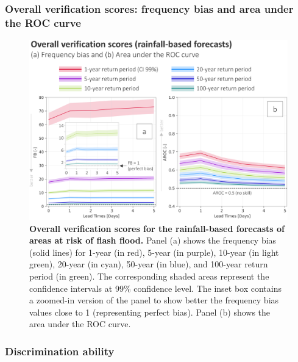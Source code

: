\subsubsection{Overall verification scores: frequency bias and area under the ROC curve}

\begin{figure}[htbp]
\centering
\includegraphics[width=\textwidth]{chapter_05/figures/rainfall_based_ff_verif_overall_scores.png}
\caption{\textbf{Overall verification scores for the rainfall-based forecasts of areas at risk of flash flood.} Panel (a) shows the frequency bias (solid lines) for 1-year (in red), 5-year (in purple), 10-year (in light green), 20-year (in cyan), 50-year (in blue), and 100-year return period (in green). The corresponding shaded areas represent the confidence intervals at 99\% confidence level. The inset box contains a zoomed-in version of the panel to show better the frequency bias values close to 1 (representing perfect bias). Panel (b) shows the area under the ROC curve.}
\label{fig:rainfall_based_ff_verif_overall_scores}
\end{figure}


\subsubsection{Discrimination ability}

